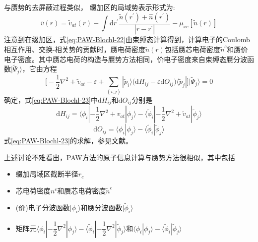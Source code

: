 与赝势的去屏蔽过程类似，%
缀加区的局域势表示形式为:
\begin{equation}
	\bar v(r)=\tilde v_{at}(r)-\int\mathrm{d}r^{\prime}\dfrac{\tilde n(r^{\prime})+\hat n(r^{\prime})}{|r-r^{\prime}|}-\mu_{xc}[\tilde n(r)]
	\label{eq:PAW-Blochl-22}
\end{equation}
注意到在缀加区，式\eqref{eq:PAW-Blochl-22}由束缚态计算得到，计算电子的\textrm{Coulomb}相互作用、交换-相关势的贡献时，赝电荷密度$\tilde n(r)$包括赝芯电荷密度$\tilde n^c$和赝价电子密度。其中赝芯电荷的构造与赝势方法相同，价电子密度来自束缚态赝分波函数$|\tilde\Psi_j\rangle$，它由方程
\begin{equation}
	\bigg[-\dfrac12\nabla^2+\tilde v_{at}-\varepsilon+\sum_{(i,j)}|\tilde p_i\rangle\big(\mathrm{d}H_{ij}-\varepsilon\mathrm{d}O_{ij}\big)\langle\tilde p_j|\bigg]|\tilde\Psi_j\rangle=0
	\label{eq:PAW-Blochl-23}
\end{equation}
确定，式\eqref{eq:PAW-Blochl-23}中$\mathrm{d}H_{ij}$和$\mathrm{d}O_{ij}$分别是
$$\mathrm{d}H_{ij}=\langle\phi_i|-\dfrac12\nabla^2+v_{at}|\phi_j\rangle-\langle\tilde\phi_i|-\dfrac12\nabla^2+\tilde v_{at}|\tilde\phi_j\rangle$$
$$\mathrm{d}O_{ij}=\langle\phi_i|\phi_j\rangle-\langle\tilde\phi_i|\tilde\phi_j\rangle$$
式\eqref{eq:PAW-Blochl-23}的求解，参见文献\cite{PRB50-17953_1994}。

上述讨论不难看出，\textrm{PAW}方法的原子信息计算与赝势方法很相似，其中包括
\begin{itemize}
	\item 缀加局域区截断半径$r_c$
	\item 芯电荷密度$n^c$和赝芯电荷密度$\tilde n^c$
	\item (价)电子分波函数$|\phi_i\rangle$和赝分波函数$|\tilde\phi_i\rangle$
	\item 矩阵元$\langle\phi_i|-\dfrac12\nabla^2|\phi_j\rangle-\langle\tilde\phi_i|-\dfrac12\nabla^2|\tilde\phi_j\rangle$和$\langle\phi_i|\phi_j\rangle-\langle\tilde\phi_i|\tilde\phi_j\rangle$
\end{itemize}

